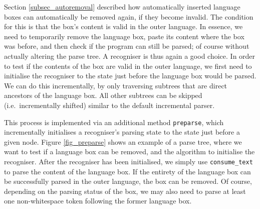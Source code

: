 \documentclass[sigplan,screen]{acmart}\settopmatter{printfolios=true,printccs=false,printacmref=false}
\begin{document}
Section \ref{subsec_autoremoval} described how automatically inserted language
boxes can automatically be removed again, if they become invalid. The condition
for this is that the box's content is valid in the outer language.  In essence,
we need to temporarily remove the language box, paste its content where the box
was before, and then check if the program can still be parsed; of course
without actually altering the parse tree. A recogniser is thus again a good
choice. In order to test if the contents of the box are valid in the outer
language, we first need to initialise the recogniser to the state just before
the language box would be parsed. We can do this incrementally, by only
traversing subtrees that are direct ancestors of the language box. All other
subtrees can be skipped (i.e.~incrementally shifted) similar to the default
incremental parser.

This process is implemented via an additional method \texttt{preparse}, which
incrementally initialises a recogniser's parsing state to the state just before
a given node. Figure \ref{fig_preparse} shows an example of a parse tree, where
we want to test if a language box can be removed, and the algorithm to
initialise the recogniser.
After the recogniser has been initialised, we simply use \texttt{consume\_text}
to parse the content of the language box. If the entirety of the language box
can be successfully parsed in the outer language, the box can be removed.  Of
course, depending on the parsing status of the box, we may also need to parse
at least one non-whitespace token following the former language box.
\end{document}
